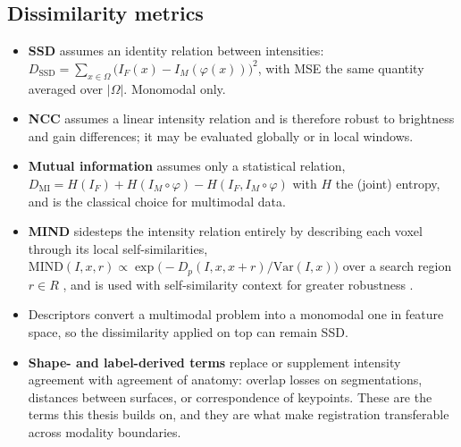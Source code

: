\subsection{Dissimilarity metrics}
\begin{itemize}
\item \textbf{SSD} assumes an identity relation between intensities: $D_{\mathrm{SSD}} = \sum_{x \in \Omega} \big(I_F(x) - I_M(\varphi(x))\big)^2$, with MSE the same quantity averaged over $|\Omega|$. Monomodal only.
\item \textbf{NCC} assumes a linear intensity relation and is therefore robust to brightness and gain differences; it may be evaluated globally or in local windows.
\item \textbf{Mutual information} assumes only a statistical relation, $D_{\mathrm{MI}} = H(I_F) + H(I_M \circ \varphi) - H(I_F, I_M \circ \varphi)$ with $H$ the (joint) entropy, and is the classical choice for multimodal data.
\item \textbf{MIND} sidesteps the intensity relation entirely by describing each voxel through its local self-similarities, $\mathrm{MIND}(I, x, r) \propto \exp\!\big(-D_p(I, x, x+r) / \mathrm{Var}(I,x)\big)$ over a search region $r \in R$ \citep{heinrich2012mind}, and is used with self-similarity context for greater robustness \citep{heinrich2013towards}.
\item Descriptors convert a multimodal problem into a monomodal one in feature space, so the dissimilarity applied on top can remain SSD.
\item \textbf{Shape- and label-derived terms} replace or supplement intensity agreement with agreement of anatomy: overlap losses on segmentations, distances between surfaces, or correspondence of keypoints. These are the terms this thesis builds on, and they are what make registration transferable across modality boundaries.
\end{itemize}

